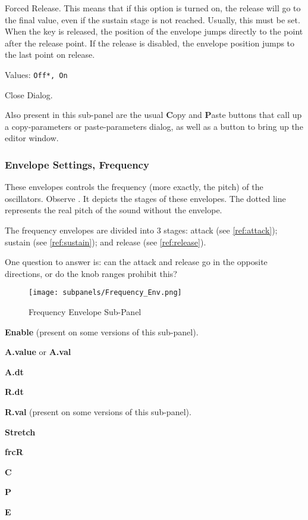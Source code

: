    Forced Release.
   This means that if this option is turned on, the release will go to the
   final value, even if the sustain stage is not reached. Usually, this must
   be set.
   When the key is released, the position of the envelope jumps directly to
   the point after the release point. If the release is disabled, the
   envelope position jumps to the last point on release.

   Values: \texttt{Off*, On}

   Close Dialog.

   Also present in this sub-panel are the usual \textbf{C}opy
   and \textbf{P}aste buttons that call up a copy-parameters or
   paste-parameters dialog, as well as a button
   to bring up the editor window.

\subsubsection{Envelope Settings, Frequency}
\label{subsubsec:envelope_settings_for_frequency}

   These envelopes controls the frequency (more exactly, the pitch) of the
   oscillators.
   Observe .
   It depicts the stages of these envelopes.
   The dotted line represents the real pitch of the sound without the envelope.

   The frequency envelopes are divided into 3 stages:
   attack (see \ref{ref:attack});
   sustain (see \ref{ref:sustain});
   and
   release (see \ref{ref:release}).

   One question to answer is:  
   can the attack and release go in the opposite directions, or do the knob
   ranges prohibit this?

\begin{figure}[H]
   \centering 
   \texttt{[image: subpanels/Frequency\_Env.png]}
   \caption[Frequency Envelope Sub-Panel]{Frequency Envelope Sub-Panel}
   \label{fig:frequency_env}
\end{figure}

   \begin{enumber}
      \item \textbf{Enable} (present on some versions of this sub-panel).
      \item \textbf{A.value} or \textbf{A.val}
      \item \textbf{A.dt}
      \item \textbf{R.dt}
      \item \textbf{R.val} (present on some versions of this sub-panel).
      \item \textbf{Stretch}
      \item \textbf{frcR}
      \item \textbf{C}
      \item \textbf{P}
      \item \textbf{E}
   \end{enumber}


